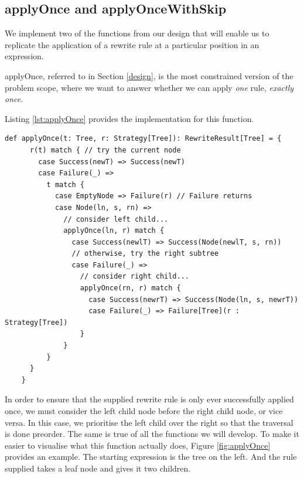 \documentclass{l4proj}
\begin{document}
\subsection{applyOnce and applyOnceWithSkip}

We implement two of the functions from our design that will enable us to replicate the application of a rewrite rule at a particular position in an expression.

applyOnce, referred to in Section \ref{design}, is the most constrained version of the problem scope, where we want to answer whether we can apply \emph{one} rule, \emph{exactly once}.  

Listing \ref{lst:applyOnce} provides the implementation for this function.

\begin{lstlisting}[caption={Function which applies a given rule to only one point in a given tree, returning the transformed tree on a Success or the original on a Failure}, label={lst:applyOnce}]
    def applyOnce(t: Tree, r: Strategy[Tree]): RewriteResult[Tree] = {
      r(t) match { // try the current node
        case Success(newT) => Success(newT)
        case Failure(_) =>
          t match {
            case EmptyNode => Failure(r) // Failure returns
            case Node(ln, s, rn) =>
              // consider left child...
              applyOnce(ln, r) match {
                case Success(newlT) => Success(Node(newlT, s, rn))
                // otherwise, try the right subtree
                case Failure(_) =>
                  // consider right child...
                  applyOnce(rn, r) match {
                    case Success(newrT) => Success(Node(ln, s, newrT))
                    case Failure(_) => Failure[Tree](r : Strategy[Tree]) 
                  }
              }
          }
      }
    }
\end{lstlisting}

In order to ensure that the supplied rewrite rule is only ever successfully applied once, we must consider the left child node before the right child node, or vice versa. %
In this case, we prioritise the left child over the right so that the traversal is done preorder. The same is true of all the functions we will develop. To make it easier to visualise what this function actually does, Figure \ref{fig:applyOnce} provides an example. The starting expression is the tree on the left. And the rule supplied takes a leaf node and gives it two children.
\end{document}
